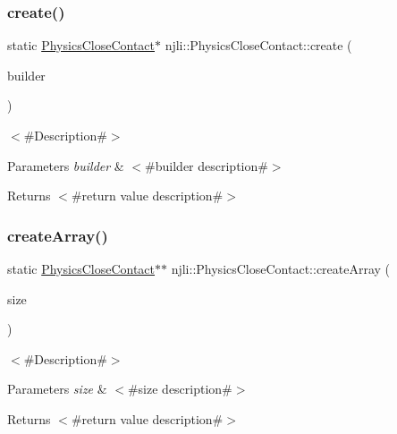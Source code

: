 \subsubsection{\texorpdfstring{create()}{create()}\hspace{0.1cm}{\footnotesize\ttfamily [3/3]}}
{\footnotesize\ttfamily static \mbox{\hyperlink{classnjli_1_1_physics_close_contact}{Physics\+Close\+Contact}}$\ast$ njli\+::\+Physics\+Close\+Contact\+::create (\begin{DoxyParamCaption}\item[{const \mbox{\hyperlink{classnjli_1_1_physics_close_contact_builder}{Physics\+Close\+Contact\+Builder}} \&}]{builder }\end{DoxyParamCaption})\hspace{0.3cm}{\ttfamily [static]}}

$<$\#\+Description\#$>$


\begin{DoxyParams}{Parameters}
{\em builder} & $<$\#builder description\#$>$\\
\hline
\end{DoxyParams}
\begin{DoxyReturn}{Returns}
$<$\#return value description\#$>$ 
\end{DoxyReturn}
\mbox{\label{classnjli_1_1_physics_close_contact_a7111929b332ea06f9c9d0c37a5d6df55}} 
\subsubsection{\texorpdfstring{create\+Array()}{createArray()}}
{\footnotesize\ttfamily static \mbox{\hyperlink{classnjli_1_1_physics_close_contact}{Physics\+Close\+Contact}}$\ast$$\ast$ njli\+::\+Physics\+Close\+Contact\+::create\+Array (\begin{DoxyParamCaption}\item[{const \mbox{\hyperlink{_util_8h_a10e94b422ef0c20dcdec20d31a1f5049}{u32}}}]{size }\end{DoxyParamCaption})\hspace{0.3cm}{\ttfamily [static]}}

$<$\#\+Description\#$>$


\begin{DoxyParams}{Parameters}
{\em size} & $<$\#size description\#$>$\\
\hline
\end{DoxyParams}
\begin{DoxyReturn}{Returns}
$<$\#return value description\#$>$ 
\end{DoxyReturn}
\mbox{\label{classnjli_1_1_physics_close_contact_af392bda92b22ec489c8a91af4e02a7e6}} 
